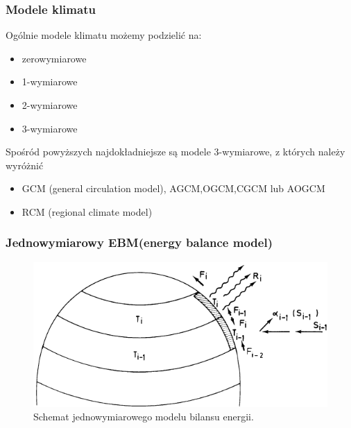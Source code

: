 \documentclass{beamer}
\begin{document}
\begin{frame}
	\frametitle{Modele klimatu}
	Ogólnie modele klimatu możemy podzielić na:
	\begin{itemize}
		\item zerowymiarowe
		\item 1-wymiarowe
		\item 2-wymiarowe
		\item 3-wymiarowe
	\end{itemize}
	\vspace{0.5cm}
	Spośród powyższych najdokładniejsze są modele 3-wymiarowe, z których należy wyróżnić
	\begin{itemize}
		\item GCM (general circulation model), AGCM,OGCM,CGCM lub AOGCM
		\item RCM (regional climate model)
	\end{itemize}
	
\end{frame}

\begin{frame}
	\frametitle{Jednowymiarowy EBM(energy balance model)}	
	\begin{figure}[h]
		\begin{center}
			\includegraphics[width=0.7\linewidth]{images/1D_EBM.png}
			\caption{Schemat jednowymiarowego modelu bilansu energii.\cite{b3}}
		\end{center}
	\end{figure}
\end{frame}
\end{document}
